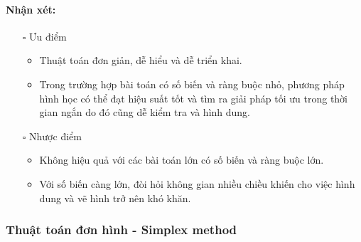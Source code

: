 \documentclass{article}
\begin{document}
\paragraph{Nhận xét:}
\begin{itemize}
    \item [$\square$] Ưu điểm
    \begin{itemize}[label=\textbullet]
        \item Thuật toán đơn giản, dễ hiểu và dễ triển khai.
        \item Trong trường hợp bài toán có số biến và ràng buộc nhỏ, phương pháp hình học có thể đạt hiệu suất tốt và tìm ra giải pháp tối ưu trong thời gian ngắn do đó cũng dễ kiểm tra và hình dung.
    \end{itemize}
    \item [$\square$] Nhược điểm
    \begin{itemize}[label=\textbullet]
        \item Không hiệu quả với các bài toán lớn có số biến và ràng buộc lớn.
        \item Với số biến càng lớn, đòi hỏi không gian nhiều chiều khiến cho việc hình dung và vẽ hình trở nên khó khăn.
    \end{itemize}
\end{itemize}
\newpage
\subsubsection{Thuật toán đơn hình - Simplex method}
\end{document}
